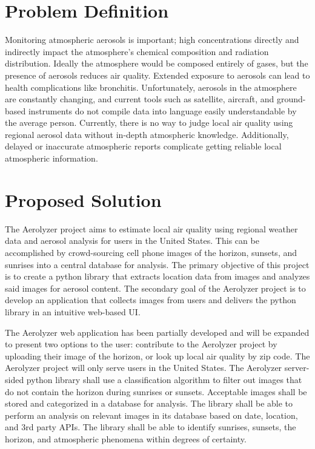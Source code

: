 \documentclass[letterpaper,10pt,draftclsnofoot,onecolumn]{IEEEtran}
\begin{document}
\clearpage
\begin{flushleft}
\section{Problem Definition}
Monitoring atmospheric aerosols is important; high concentrations directly and indirectly impact the atmosphere's chemical composition and radiation distribution. Ideally the atmosphere would be composed entirely of gases, but the presence of aerosols reduces air quality. Extended exposure to aerosols can lead to health complications like bronchitis. Unfortunately, aerosols in the atmosphere are constantly changing, and current tools such as satellite, aircraft, and ground-based instruments do not compile data into language easily understandable by the average person. Currently, there is no way to judge local air quality using regional aerosol data without in-depth atmospheric knowledge. Additionally, delayed or inaccurate atmospheric reports complicate getting reliable local atmospheric information. 

\section{Proposed Solution}
The Aerolyzer project aims to estimate local air quality using regional weather data and aerosol analysis for users in the United States. This can be accomplished by crowd-sourcing cell phone images of the horizon, sunsets, and sunrises into a central database for analysis. The primary objective of this project is to create a python library that extracts location data from images and analyzes said images for aerosol content. The secondary goal of the Aerolyzer project is to develop an application that collects images from users and delivers the python library in an intuitive web-based UI. 
\par
The Aerolyzer web application has been partially developed and will be expanded to present two options to the user: contribute to the Aerolyzer project by uploading their image of the horizon, or look up local air quality by zip code. The Aerolyzer project will only serve users in the United States. The Aerolyzer server-sided python library shall use a classification algorithm to filter out images that do not contain the horizon during sunrises or sunsets. Acceptable images shall be stored and categorized in a database for analysis. The library shall be able to perform an analysis on relevant images in its database based on date, location, and 3rd party APIs. The library shall be able to identify sunrises, sunsets, the horizon, and atmospheric phenomena within degrees of certainty.


\end{flushleft}
\end{document}
